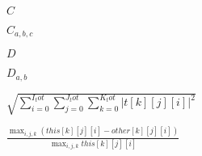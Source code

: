 \documentclass{article}
\begin{document}
$C$
\pagebreak

$C_{a,b,c}$
\pagebreak

$D$
\pagebreak

$D_{a,b}$
\pagebreak

$\sqrt{ \sum_{i=0}^{I_tot}\sum_{j=0}^{J_tot}\sum_{k=0}^{K_tot}
|t[k][j][i]|^2 }$
\pagebreak

$ \frac{ \max_{i,j,k}(this[k][j][i] - other[k][j][i]) }{
\max_{i,j,k}this[k][j][i] } $
\pagebreak
\end{document}
